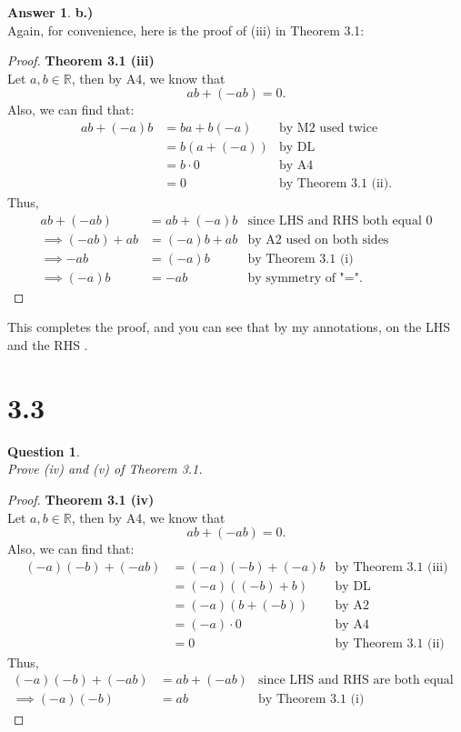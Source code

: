 \documentclass[10pt,a4paper]{article}
\newtheorem*{question*}{Question}
\theoremstyle{definition}
\newtheorem*{answer*}{Answer}
\begin{document}
\begin{answer*}{\textbf{b.)}}
\\Again, for convenience, here is the proof of (iii) in Theorem 3.1:

\begin{proof}{\textbf{Theorem 3.1 (iii)}}
\\Let $a,b \in \mathbb{R}$, then by A4, we know that
\begin{equation}
ab + (-ab) = 0.
\end{equation}
Also, we can find that:
\begin{align}
ab + (-a)b &= ba + b(-a) &\text{by M2 used twice}\\
&= b(a + (-a)) &\text{by DL}\\
&= b \cdot 0 &\text{by A4}\\
&= 0 &\text{by Theorem 3.1 (ii).}
\end{align}
Thus,
\begin{align}
ab + (-ab) &= ab + (-a)b &\text{since LHS and RHS both equal 0}\\
\implies (-ab) + ab &= (-a)b + ab &\text{by A2 used on both sides}\\
\implies -ab &= (-a)b &\text{by Theorem 3.1 (i)}\\
\implies (-a)b &= -ab &\text{by symmetry of "=".}
\end{align}
\end{proof}
This completes the proof, and you can see that by my annotations,  on the LHS and the RHS . 
\end{answer*}

\section*{3.3}
\begin{question*}{$ $}
\\Prove (iv) and (v) of Theorem 3.1.
\end{question*}

\begin{proof}{\textbf{Theorem 3.1 (iv)}}
\\Let $a,b \in \mathbb{R}$, then by A4, we know that
\begin{equation}
ab + (-ab) = 0.
\end{equation}
Also, we can find that:
\begin{align*}
(-a)(-b) + (-ab) &= (-a)(-b) + (-a)b &\text{by Theorem 3.1 (iii)}\\
&= (-a)((-b) + b) &\text{by DL}\\
&= (-a)(b + (-b)) &\text{by A2}\\
&= (-a) \cdot 0 &\text{by A4}\\
&= 0 &\text{by Theorem 3.1 (ii)}
\end{align*}
Thus, 
\begin{align*}
(-a)(-b) + (-ab) &= ab + (-ab) &\text{since LHS and RHS are both equal to 0}\\
\implies (-a)(-b) &= ab &\text{by Theorem 3.1 (i)}
\end{align*}
\end{proof}
\end{document}
